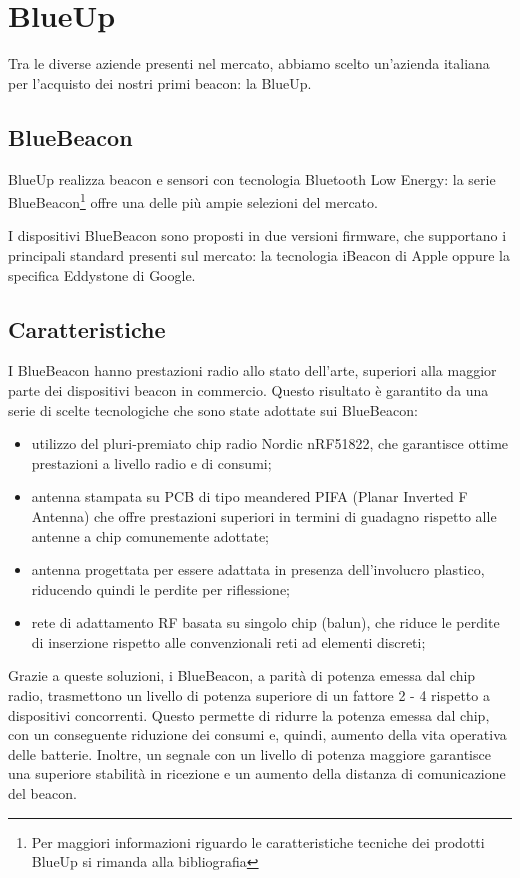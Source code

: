 \section{BlueUp}
Tra le diverse aziende presenti nel mercato, abbiamo scelto un'azienda italiana per l'acquisto dei nostri primi beacon: la BlueUp.
\subsection{BlueBeacon}
BlueUp realizza beacon e sensori con tecnologia Bluetooth Low Energy: la serie BlueBeacon\footnote{Per maggiori informazioni riguardo le caratteristiche tecniche dei prodotti BlueUp si rimanda alla bibliografia\cite{blueup}} offre una delle più ampie selezioni del mercato. 

I dispositivi BlueBeacon sono proposti in due versioni firmware, che supportano i principali standard presenti sul mercato: 
la tecnologia iBeacon di Apple oppure la specifica Eddystone di Google.
\subsection{Caratteristiche}
I BlueBeacon hanno prestazioni radio allo stato dell'arte, superiori alla maggior parte dei dispositivi beacon in commercio. 
Questo risultato è garantito da una serie di scelte tecnologiche che sono state adottate sui BlueBeacon:
\begin{itemize}
\item utilizzo del pluri-premiato chip radio Nordic nRF51822, che garantisce ottime prestazioni a livello radio e di consumi;
\item antenna stampata su PCB di tipo meandered PIFA (Planar Inverted F Antenna) che offre prestazioni superiori in termini di guadagno rispetto alle antenne a chip comunemente adottate;
\item antenna progettata per essere adattata in presenza dell'involucro plastico, riducendo quindi le perdite per riflessione;
\item rete di adattamento RF basata su singolo chip (balun), che riduce le perdite di inserzione rispetto alle convenzionali reti ad elementi discreti;
\end{itemize}

Grazie a queste soluzioni, i BlueBeacon, a parità di potenza emessa dal chip radio, trasmettono un livello di potenza superiore di un fattore 2 - 4 rispetto a dispositivi concorrenti. Questo permette di ridurre la potenza emessa dal chip, con un conseguente riduzione dei consumi e, quindi, aumento della vita operativa delle batterie. Inoltre, un segnale con un livello di potenza maggiore garantisce una superiore stabilità in ricezione e un aumento della distanza di comunicazione del beacon. 

